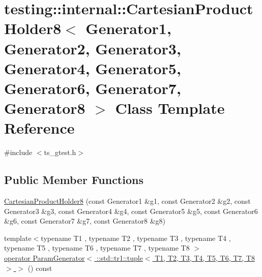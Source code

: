 \hypertarget{classtesting_1_1internal_1_1CartesianProductHolder8}{\section{testing\-:\-:internal\-:\-:Cartesian\-Product\-Holder8$<$ Generator1, Generator2, Generator3, Generator4, Generator5, Generator6, Generator7, Generator8 $>$ Class Template Reference}
\label{classtesting_1_1internal_1_1CartesianProductHolder8}
}


{\ttfamily \#include $<$ts\-\_\-gtest.\-h$>$}

\subsection*{Public Member Functions}
\begin{DoxyCompactItemize}
\item 
\hyperlink{classtesting_1_1internal_1_1CartesianProductHolder8_adacdd7a2e15963d1b2f559d65f6b2aac}{Cartesian\-Product\-Holder8} (const Generator1 \&g1, const Generator2 \&g2, const Generator3 \&g3, const Generator4 \&g4, const Generator5 \&g5, const Generator6 \&g6, const Generator7 \&g7, const Generator8 \&g8)
\item 
{\footnotesize template$<$typename T1 , typename T2 , typename T3 , typename T4 , typename T5 , typename T6 , typename T7 , typename T8 $>$ }\\\hyperlink{classtesting_1_1internal_1_1CartesianProductHolder8_a0cebd8cc28ade7d82c4d6b5f7ce9ee86}{operator Param\-Generator$<$ \-::std\-::tr1\-::tuple$<$ T1, T2, T3, T4, T5, T6, T7, T8 $>$ $>$} () const 
\end{DoxyCompactItemize}


